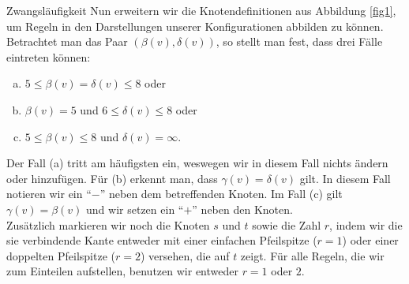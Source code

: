 \begin{section}{Zwangsläufigkeit}
 Nun erweitern wir die Knotendefinitionen aus Abbildung \ref{fig1}, um Regeln in den Darstellungen unserer Konfigurationen abbilden zu können. Betrachtet man das Paar $(\beta(v),\delta(v))$, so stellt man fest, dass drei Fälle eintreten können:
 
 \begin{enumerate}[(a)]
  \item $5 \leq \beta(v) = \delta(v) \leq 8$ oder
  \item $\beta(v) = 5$ und $6 \leq \delta(v) \leq 8$ oder
  \item $5 \leq \beta(v) \leq 8$ und $\delta(v) = \infty$.
 \end{enumerate}
 
 Der Fall (a) tritt am häufigsten ein, weswegen wir in diesem Fall nichts ändern oder hinzufügen. Für (b) erkennt man, dass $\gamma(v) = \delta(v)$ gilt. In diesem Fall notieren wir ein ``$-$'' neben dem betreffenden Knoten. Im Fall (c) gilt $\gamma(v) = \beta(v)$ und wir setzen ein ``$+$'' neben den Knoten.\\
 Zusätzlich markieren wir noch die Knoten $s$ und $t$ sowie die Zahl $r$, indem wir die sie verbindende Kante entweder mit einer einfachen Pfeilspitze ($r=1$) oder einer doppelten Pfeilspitze ($r=2$) versehen, die auf $t$ zeigt. Für alle Regeln, die wir zum Einteilen aufstellen, benutzen wir entweder $r=1$ oder $2$. 
 

\end{section}
